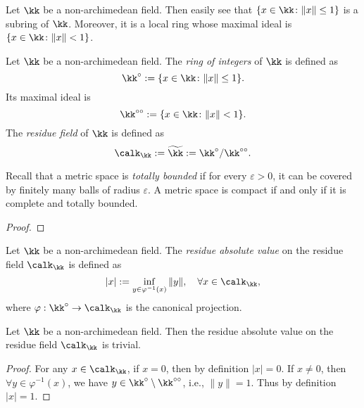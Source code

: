     Let \(\kk\) be a non-archimedean field.
    Then easily see that \(\{x \in \kk\colon \|x\|\leq 1\}\) is a subring of \(\kk\).
    Moreover, it is a local ring whose maximal ideal is \(\{x \in \kk\colon \|x\| < 1\}\).

    \begin{definition}\label{def:non-archimedean_field_ring_of_integers_maximal_ideal_and_residue_field}
        Let \(\kk\) be a non-archimedean field.
        The \emph{ring of integers} of \(\kk\) is defined as
        \[ \kk^\circ := \{x \in \kk\colon \|x\|\leq 1\}. \]
        Its maximal ideal is
        \[ \kk^{\circ\circ} := \{x \in \kk\colon \|x\| < 1\}. \]
        The \emph{residue field} of \(\kk\) is defined as
        \[ \calk_\kk := \widetilde{\kk} := \kk^\circ / \kk^{\circ\circ}. \]
    \end{definition}


    \begin{lemma}\label{prop:totally_bounded_and_complete_and_compact}
        Recall that a metric space is \emph{totally bounded} if for every \(\varepsilon > 0\), it can be covered by finitely many balls of radius \(\varepsilon\).
        A metric space is compact if and only if it is complete and totally bounded.
    \end{lemma}
    \begin{proof}
    \end{proof}

    \begin{definition}\label{def:residue_absolute_value_on_residue_fields}
        Let \(\kk\) be a non-archimedean field.
        The \emph{residue absolute value} on the residue field \(\calk_\kk\) is defined as
        \[ |x| := \inf_{y \in \varphi^{-1}(x)} \|y\|, \quad \forall x \in \calk_\kk, \]
        where \(\varphi: \kk^\circ \to \calk_\kk\) is the canonical projection.
    \end{definition}

    \begin{proposition}\label{prop:residue_absolute_value_on_residue_fields_is_trivial}
        Let \(\kk\) be a non-archimedean field.
        Then the residue absolute value on the residue field \(\calk_\kk\) is trivial.
    \end{proposition}
    \begin{proof}
        For any \(x \in \calk_\kk\), if \(x = 0\), then by definition \(|x| = 0\).
        If \(x \neq 0\), then \(\forall y \in \varphi^{-1}(x)\), we have \(y \in \kk^\circ \setminus \kk^{\circ\circ}\), i.e., \(\|y\| = 1\).
        Thus by definition \(|x| = 1\).
    \end{proof}

